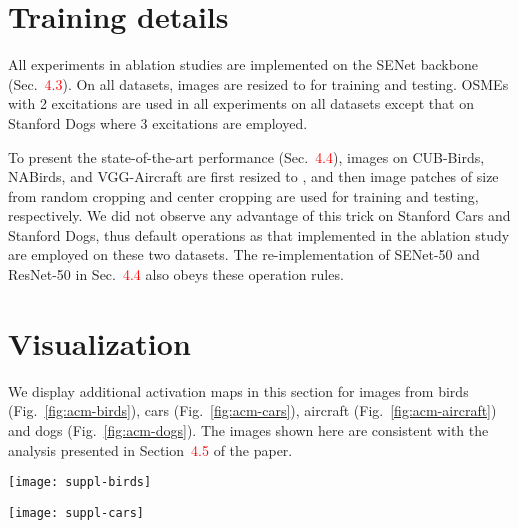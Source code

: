\documentclass[10pt,twocolumn,letterpaper]{article}
\begin{document}
\section{Training details}
All experiments in ablation studies are implemented on the SENet backbone (Sec.~\textcolor{red}{4.3}). On all datasets, images are resized to  for training and testing. OSMEs with 2 excitations are used in all experiments on all datasets except that on Stanford Dogs where 3 excitations are employed. 

To present the state-of-the-art performance (Sec.~\textcolor{red}{4.4}), images on CUB-Birds, NABirds, and VGG-Aircraft are first resized to , and then image patches of size  from random cropping and center cropping are used for training and testing, respectively. We did not observe any advantage of this trick on Stanford Cars and Stanford Dogs, thus default operations as that implemented in the ablation study are employed on these two datasets. The re-implementation of SENet-50 and ResNet-50 in Sec.~\textcolor{red}{4.4} also obeys these operation rules.

\section{Visualization}
\label{sec:visual}
We display additional activation maps in this section for images from birds (Fig.~\ref{fig:acm-birds}), cars (Fig.~\ref{fig:acm-cars}), aircraft (Fig.~\ref{fig:acm-aircraft}) and dogs (Fig.~\ref{fig:acm-dogs}). The images shown here are consistent with the analysis presented in Section~\textcolor{red}{4.5} of the paper.

\begin{figure*}[h]
\begin{center}
\texttt{[image: suppl-birds]}
\end{center}
\caption{Superimposed display of activation maps (b) , (c)  and (d)   for images from CUB-Birds. The first column (a) shows original images and the last two columns (e) are combined activation maps from corresponding columns of ,  and  . Each of (b)(e) shows the activations of two excitation modules in corresponding layers. Best viewed in color.} 
\label{fig:acm-birds}
\end{figure*}


\begin{figure*}[h]
\begin{center}
\texttt{[image: suppl-cars]}
\end{center}
\caption{Superimposed display of activation maps (b) , (c)  and (d)   for images from Stanford Cars. The first column (a) shows original images and the last two columns (e) are combined activation maps from corresponding columns of ,  and  . Each of (b)(e) shows the activations of two excitation modules in corresponding layers. Best viewed in color.} 
\label{fig:acm-cars}
\end{figure*}
\end{document}
